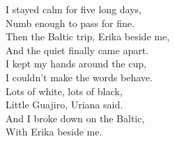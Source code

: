 \begin{lyrics}
I stayed calm for five long days,\\
Numb enough to pass for fine.\\
Then the Baltic trip, Erika beside me,\\
And the quiet finally came apart.\\
I kept my hands around the cup,\\
I couldn’t make the words behave.\\
Lots of white, lots of black,\\
Little Guajiro, Uriana said.\\
And I broke down on the Baltic,\\
With Erika beside me.
\end{lyrics}

